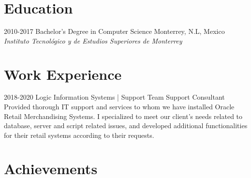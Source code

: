 \documentclass[]{twentysecondcv}
\begin{document}
\section{Education}

\begin{twenty}
  \twentyitem
    {2010-2017}
    {Bachelor's Degree {\normalfont in Computer Science}}
    {Monterrey, N.L, Mexico}
    {\emph{Instituto Tecnológico y de Estudios Superiores de Monterrey}}
\end{twenty}


\section{Work Experience}

\begin{twenty}
  \twentyitem
    {2018-2020}
    {Logic Information Systems | Support Team}
    {Support Consultant}
    {Provided thorough IT support and services to whom we have installed Oracle Retail Merchandising Systems. I specialized to meet our client's needs related to database, server and script related issues, and developed additional functionalities for their retail systems according to their requests.}
\end{twenty}




\section{Achievements}
\end{document}

